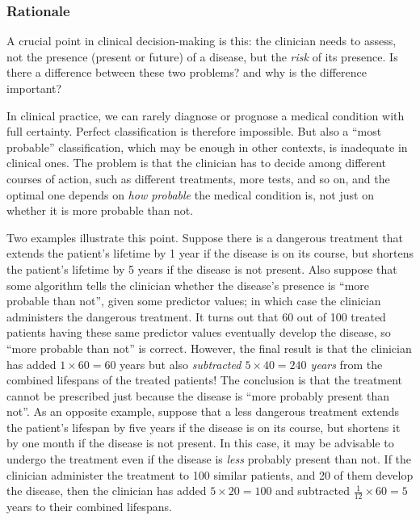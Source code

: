 \documentclass[a4paper,12pt,%
onecolumn,oneside,article,%
british%
]{memoir}
\theoremstyle{remark}
\theoremstyle{innote}
\renewcommand*{\|}[1][]{\nonscript\:#1\vert\nonscript\:\mathopen{}}
\begin{document}
\subsubsection{Rationale}
\label{sec:expected_utility_theory}


A crucial point in clinical decision-making is this: the clinician needs to assess, not the presence (present or future) of a disease, but the \emph{risk} of its presence. Is there a difference between these two problems? and why is the difference important?

In clinical practice, we can rarely diagnose or prognose a medical condition with full certainty. Perfect classification is therefore impossible. But also a \enquote{most probable} classification, which may be enough in other contexts, is inadequate in clinical ones. The problem is that the clinician has to decide among different courses of action, such as different treatments, more tests, and so on, and the optimal one depends on \emph{how probable} the medical condition is, not just on whether it is more probable than not.

Two examples illustrate this point. Suppose there is a dangerous treatment that extends the patient's lifetime by 1 year if the disease is on its course, but shortens the patient's lifetime by 5 years if the disease is not present. Also suppose that some algorithm tells the clinician whether the disease's presence is \enquote{more probable than not}, given some predictor values; in which case the clinician administers the dangerous treatment. It turns out that 60 out of 100 treated patients having these same predictor values eventually develop the disease, so \enquote{more probable than not} is correct. However, the final result is that the clinician has added $1 \times 60 = 60$ years but also \emph{subtracted $\mathit{5 \times 40 = 240}$ years} from the combined lifespans of the treated patients! The conclusion is that the treatment cannot be prescribed just because the disease is \enquote{more probably present than not}. As an opposite example, suppose that a less dangerous treatment extends the patient's lifespan by five years if the disease is on its course, but shortens it by one month if the disease is not present. In this case, it may be advisable to undergo the treatment even if the disease is \emph{less} probably present than not. If the clinician administer the treatment to 100 similar patients, and 20 of them develop the disease, then the clinician has added $5 \times 20=100$ and subtracted $\tfrac{1}{12} \times 60=5$ years to their combined lifespans.
\end{document}
